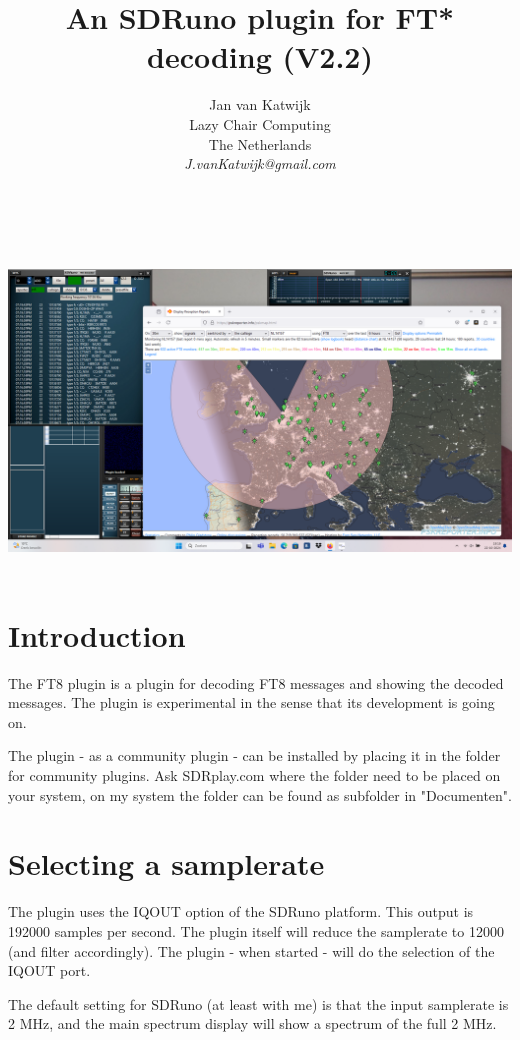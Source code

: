 \documentclass[11pt]{article}
\begin{document}
\title{An SDRuno plugin for FT* decoding (V2.2)}
\author{
Jan van Katwijk\\
Lazy Chair Computing \\
The Netherlands\\
{\em J.vanKatwijk@gmail.com}}
\maketitle
\ \\
\ \\
\includegraphics[width=170mm]{SDRunoPlugin_ft8.png}
\ \\
\section{Introduction}
The FT8 plugin is a plugin for decoding FT8 messages and
showing the decoded messages. The plugin is experimental in the sense
that its development is going on.
\par
The plugin - as a community plugin - can be installed by placing it
in the folder for community plugins. Ask SDRplay.com where the folder 
need to be placed on your system, on my system the folder can be found as
subfolder in "Documenten".

\section{Selecting a samplerate}
The plugin uses the IQOUT option of the SDRuno platform. This
output is 192000 samples per second. The plugin itself will reduce
the samplerate to 12000 (and filter accordingly).
The plugin - when started - will do the selection of the IQOUT port.
\par
The default setting for SDRuno (at least with me) is that the input samplerate
is 2 MHz, and the main spectrum display will show a spectrum of the full 2 MHz.
\end{document}
